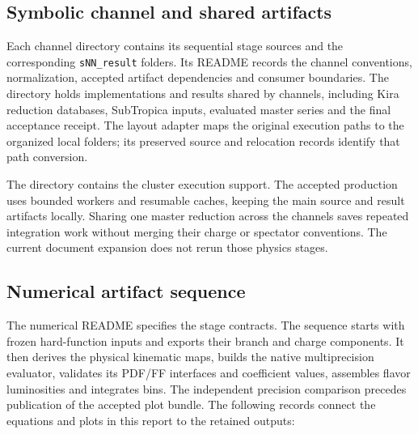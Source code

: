 \documentclass[11pt,a4paper]{article}
\begin{document}
\subsection{Symbolic channel and shared artifacts}

Each channel directory contains its sequential stage sources and the
corresponding \texttt{sNN\_result} folders. Its README records the
channel conventions, normalization, accepted artifact dependencies and
consumer boundaries. The  directory holds implementations
and results shared by channels, including Kira reduction databases,
SubTropica inputs, evaluated master series and the final acceptance
receipt. The layout adapter maps the original execution paths to the
organized local folders; its preserved source and relocation records
identify that path conversion.

The  directory contains the cluster execution support.
The accepted production uses bounded workers and resumable caches,
keeping the main source and result artifacts locally. Sharing one
master reduction across the channels saves repeated integration work
without merging their charge or spectator conventions. The current
document expansion does not rerun those physics stages.

\subsection{Numerical artifact sequence}

The numerical README specifies the stage contracts. The sequence starts
with frozen hard-function inputs and exports their branch and charge
components. It then derives the physical kinematic maps, builds the
native multiprecision evaluator, validates its PDF/FF interfaces and
coefficient values, assembles flavor luminosities and integrates bins.
The independent precision comparison precedes publication of the
accepted plot bundle. The following records connect the equations and
plots in this report to the retained outputs:
\end{document}
